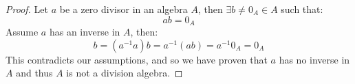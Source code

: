 \begin{proof}
	Let $a$ be a zero divisor in an algebra $A$, then $\exists b \neq 0_A \in A$ such that:
	\[ab = 0_A\]
	Assume $a$ has an inverse in $A$, then:
	\[b = (a^{-1}a)b = a^{-1}(ab) = a^{-1}0_A = 0_A\]
	This contradicts our assumptions, and so we have proven that $a$ has no inverse in $A$ and thus $A$ is not a division algebra.
\end{proof}
